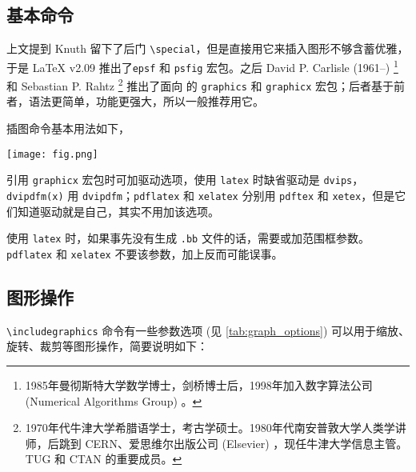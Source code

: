\subsection{基本命令}

上文提到 Knuth 留下了后门 \verb|\special|，但是直接用它来插入图形不够含蓄优雅，于是 \LaTeX{} v2.09 推出了\texttt{epsf} 和 \texttt{psfig} 宏包。之后 David P. Carlisle (1961--)\indexCarlisle{} \footnote{1985年曼彻斯特大学数学博士，剑桥博士后，1998年加入数字算法公司 (Numerical Algorithms Group) 。} 和 Sebastian P. Rahtz\indexRahtz{} \footnote{1970年代牛津大学希腊语学士，考古学硕士。1980年代南安普敦大学人类学讲师，后跳到 CERN、爱思维尔出版公司 (Elsevier) ，现任牛津大学信息主管。TUG 和 CTAN 的重要成员。} 推出了面向 \LaTeXe 的 \texttt{graphics} 和 \texttt{graphicx} 宏包；后者基于前者，语法更简单，功能更强大，所以一般推荐用它。

插图命令基本用法如下，

\begin{Code}[]
\usepackage[dvipdfm]{graphicx}
\texttt{[image: fig.png]}
\end{Code}

引用 \texttt{graphicx} 宏包时可加驱动选项，使用 \texttt{latex} 时缺省驱动是 \texttt{dvips}，\texttt{dvipdfm(x)} 用 \texttt{dvipdfm}；\texttt{pdflatex} 和 \texttt{xelatex} 分别用 \texttt{pdftex} 和 \texttt{xetex}，但是它们知道驱动就是自己，其实不用加该选项。

使用 \texttt{latex} 时，如果事先没有生成 \texttt{.bb} 文件的话，需要或加范围框参数。\texttt{pdflatex} 和 \texttt{xelatex} 不要该参数，加上反而可能误事。

\subsection{图形操作}

\verb|\includegraphics| 命令有一些参数选项 (见 \autoref{tab:graph_options}) 可以用于缩放、旋转、裁剪等图形操作，简要说明如下：

